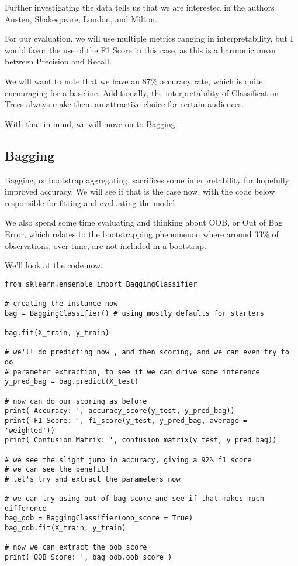 \documentclass[12pt, letterpaper]{article}
\begin{document}
Further investigating the data tells us that we are interested in the authors Austen, Shakespeare, London, and Milton. 

For our evaluation, we will use multiple metrics ranging in interpretability, but I would favor the use of the F1 Score in this case, as this is a harmonic mean between Precision and Recall. 

We will want to note that we have an 87\% accuracy rate, which is quite encouraging for a baseline. Additionally, the interpretability of Classification Trees always make them an attractive choice for certain audiences.

With that in mind, we will move on to Bagging. 

\subsection{Bagging}

Bagging, or bootstrap aggregating, sacrifices some interpretability for hopefully improved accuracy. We will see if that is the case now, with the code below responsible for fitting and evaluating the model. 

We also spend some time evaluating and thinking about OOB, or Out of Bag Error, which relates to the bootstrapping phenomenon where around 33\% of observations, over time, are not included in a bootstrap. 

We'll look at the code now. 

\begin{verbatim}
from sklearn.ensemble import BaggingClassifier 

# creating the instance now 
bag = BaggingClassifier() # using mostly defaults for starters 

bag.fit(X_train, y_train) 

# we'll do predicting now , and then scoring, and we can even try to do 
# parameter extraction, to see if we can drive some inference 
y_pred_bag = bag.predict(X_test)

# now can do our scoring as before 
print('Accuracy: ', accuracy_score(y_test, y_pred_bag)) 
print('F1 Score: ', f1_score(y_test, y_pred_bag, average = 'weighted')) 
print('Confusion Matrix: ', confusion_matrix(y_test, y_pred_bag)) 

# we see the slight jump in accuracy, giving a 92% f1 score 
# we can see the benefit!
# let's try and extract the parameters now

# we can try using out of bag score and see if that makes much difference 
bag_oob = BaggingClassifier(oob_score = True) 
bag_oob.fit(X_train, y_train) 

# now we can extract the oob score 
print('OOB Score: ', bag_oob.oob_score_) 
\end{verbatim}
\end{document}
